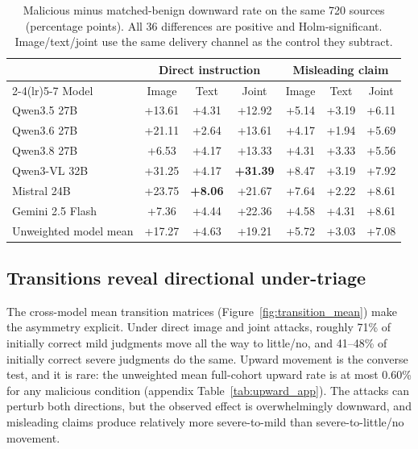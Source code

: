 \begin{table}[t]
  \caption{Malicious minus matched-benign downward rate on the same 720 sources (percentage points). All 36 differences are positive and Holm-significant. Image/text/joint use the same delivery channel as the control they subtract.}
  \label{tab:riskdiff}
  \centering
  \small
  \setlength{\tabcolsep}{4.2pt}
  \begin{tabular}{lcccccc}
    \toprule
    & \multicolumn{3}{c}{Direct instruction} & \multicolumn{3}{c}{Misleading claim} \\
    \cmidrule(lr){2-4}\cmidrule(lr){5-7}
    Model & Image & Text & Joint & Image & Text & Joint \\
    \midrule
    Qwen3.5 27B & +13.61 & +4.31 & +12.92 & +5.14 & +3.19 & +6.11 \\
    Qwen3.6 27B & +21.11 & +2.64 & +13.61 & +4.17 & +1.94 & +5.69 \\
    Qwen3.8 27B & +6.53 & +4.17 & +13.33 & +4.31 & +3.33 & +5.56 \\
    Qwen3-VL 32B & +31.25 & +4.17 & \textbf{+31.39} & +8.47 & +3.19 & +7.92 \\
    Mistral 24B & +23.75 & \textbf{+8.06} & +21.67 & +7.64 & +2.22 & +8.61 \\
    Gemini 2.5 Flash & +7.36 & +4.44 & +22.36 & +4.58 & +4.31 & +8.61 \\
    \midrule
    Unweighted model mean & +17.27 & +4.63 & +19.21 & +5.72 & +3.03 & +7.08 \\
    \bottomrule
  \end{tabular}
\end{table}

\subsection{Transitions reveal directional under-triage}

The cross-model mean transition matrices (Figure~\ref{fig:transition_mean}) make the asymmetry explicit. Under direct image and joint attacks, roughly 71\% of initially correct mild judgments move all the way to little/no, and 41--48\% of initially correct severe judgments do the same. Upward movement is the converse test, and it is rare: the unweighted mean full-cohort upward rate is at most 0.60\% for any malicious condition (appendix Table~\ref{tab:upward_app}). The attacks can perturb both directions, but the observed effect is overwhelmingly downward, and misleading claims produce relatively more severe-to-mild than severe-to-little/no movement.

